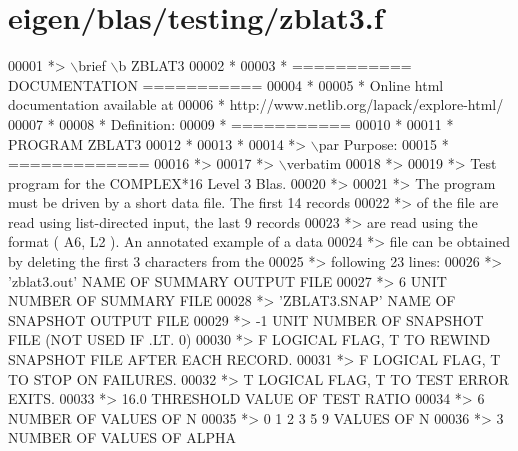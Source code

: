\hypertarget{eigen_2blas_2testing_2zblat3_8f_source}{}\section{eigen/blas/testing/zblat3.f}
\label{eigen_2blas_2testing_2zblat3_8f_source}

\begin{DoxyCode}
00001 \textcolor{comment}{*> \(\backslash\)brief \(\backslash\)b ZBLAT3}
00002 \textcolor{comment}{*}
00003 \textcolor{comment}{*  =========== DOCUMENTATION ===========}
00004 \textcolor{comment}{*}
00005 \textcolor{comment}{* Online html documentation available at }
00006 \textcolor{comment}{*            http://www.netlib.org/lapack/explore-html/ }
00007 \textcolor{comment}{*}
00008 \textcolor{comment}{*  Definition:}
00009 \textcolor{comment}{*  ===========}
00010 \textcolor{comment}{*}
00011 \textcolor{comment}{*       PROGRAM ZBLAT3}
00012 \textcolor{comment}{* }
00013 \textcolor{comment}{*}
00014 \textcolor{comment}{*> \(\backslash\)par Purpose:}
00015 \textcolor{comment}{*  =============}
00016 \textcolor{comment}{*>}
00017 \textcolor{comment}{*> \(\backslash\)verbatim}
00018 \textcolor{comment}{*>}
00019 \textcolor{comment}{*> Test program for the COMPLEX*16       Level 3 Blas.}
00020 \textcolor{comment}{*>}
00021 \textcolor{comment}{*> The program must be driven by a short data file. The first 14 records}
00022 \textcolor{comment}{*> of the file are read using list-directed input, the last 9 records}
00023 \textcolor{comment}{*> are read using the format ( A6, L2 ). An annotated example of a data}
00024 \textcolor{comment}{*> file can be obtained by deleting the first 3 characters from the}
00025 \textcolor{comment}{*> following 23 lines:}
00026 \textcolor{comment}{*> 'zblat3.out'      NAME OF SUMMARY OUTPUT FILE}
00027 \textcolor{comment}{*> 6                 UNIT NUMBER OF SUMMARY FILE}
00028 \textcolor{comment}{*> 'ZBLAT3.SNAP'     NAME OF SNAPSHOT OUTPUT FILE}
00029 \textcolor{comment}{*> -1                UNIT NUMBER OF SNAPSHOT FILE (NOT USED IF .LT. 0)}
00030 \textcolor{comment}{*> F        LOGICAL FLAG, T TO REWIND SNAPSHOT FILE AFTER EACH RECORD.}
00031 \textcolor{comment}{*> F        LOGICAL FLAG, T TO STOP ON FAILURES.}
00032 \textcolor{comment}{*> T        LOGICAL FLAG, T TO TEST ERROR EXITS.}
00033 \textcolor{comment}{*> 16.0     THRESHOLD VALUE OF TEST RATIO}
00034 \textcolor{comment}{*> 6                 NUMBER OF VALUES OF N}
00035 \textcolor{comment}{*> 0 1 2 3 5 9       VALUES OF N}
00036 \textcolor{comment}{*> 3                 NUMBER OF VALUES OF ALPHA}

\end{DoxyCode}
